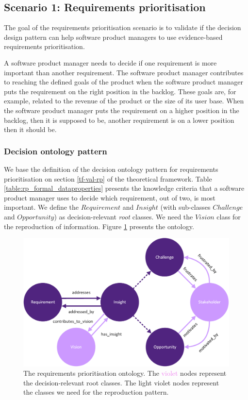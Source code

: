 \subsection{Scenario 1: Requirements prioritisation} \label{val-rp}
The goal of the requirements prioritisation scenario is to validate if the decision design pattern can help software product managers to use evidence-based requirements prioritisation.

\begin{center}
\large\color{document}{\valone} 
\end{center}

A software product manager needs to decide if one requirement is more important than another requirement. The software product manager contributes to reaching the defined goals of the product when the software product manager puts the requirement on the right position in the backlog. These goals are, for example, related to the revenue of the product or the size of its user base. When the software product manager puts the requirement on a higher position in the backlog, then it is supposed to be, another requirement is on a lower position then it should be.

\subsubsection{Decision ontology pattern}
We base the definition of the decision ontology pattern for requirements prioritisation on section \ref{tf-val-rp}  of the theoretical framework. Table \ref{table:rp_formal_dataproperties} presents the knowledge criteria that a software product manager uses to decide which requirement, out of two, is most important. We define the $Requirement$ and $Insight$ (with sub-classes $Challenge$ and $Opportunity$) as decision-relevant \emph{root} classes. We need the $Vision$ class for the reproduction of information. Figure \ref{fig:rpp-ont} presents the ontology.  

\begin{figure}[H]
\centering
  \includegraphics[width=12cm]{../../Images/05_Validation/05_ONT_RP.png}
  \caption{The requirements prioritisation ontology. The \textcolor{Violet}{violet} nodes represent the decision-relevant root classes. The \textcolor{LightViolet}{light violet} nodes represent the classes we need for the reproduction pattern.}
  \label{fig:rpp-ont}
\end{figure}

